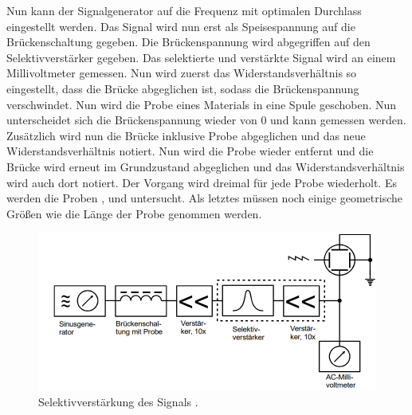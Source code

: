 \noindent Nun kann der Signalgenerator auf die Frequenz mit optimalen Durchlass eingestellt werden.
Das Signal wird nun erst als Speisespannung auf die Brückenschaltung gegeben. Die Brückenspannung wird abgegriffen auf den Selektivverstärker gegeben.
Das selektierte und verstärkte Signal wird an einem Millivoltmeter gemessen. Nun wird zuerst das Widerstandsverhältnis so eingestellt, dass die Brücke abgeglichen ist, sodass
die Brückenspannung verschwindet. Nun wird die Probe eines Materials in eine Spule geschoben. Nun unterscheidet sich die Brückenspannung wieder
von 0 und kann gemessen werden. Zusätzlich wird nun die Brücke inklusive Probe abgeglichen und das neue
Widerstandsverhältnis notiert. Nun wird die Probe wieder entfernt und die Brücke wird erneut im Grundzustand abgeglichen und das Widerstandsverhältnis wird auch dort notiert.
Der Vorgang wird dreimal für jede Probe wiederholt. Es werden die Proben , und  untersucht.
Als letztes müssen noch einige geometrische Größen wie die Länge der Probe genommen werden.
\begin{figure}[H]
    \centering
    \includegraphics[scale=0.7]{content/Messschaltung.png}
    \caption{Selektivverstärkung des Signals \cite{sample}.}
    \label{fig:Messung}
\end{figure}

